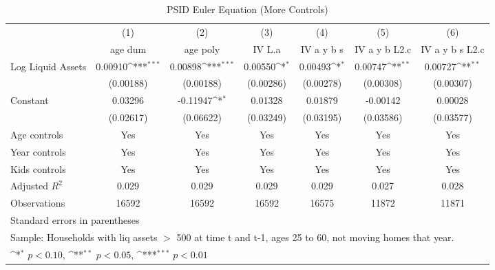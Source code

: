 {
\def\sym#1{\ifmmode^{#1}\else\(^{#1}\)\fi}
\begin{longtable}{l*{6}{c}}
\caption{PSID Euler Equation (More Controls)}\\
\toprule\endfirsthead\midrule\endhead\midrule\endfoot\endlastfoot
                    &\multicolumn{1}{c}{(1)}&\multicolumn{1}{c}{(2)}&\multicolumn{1}{c}{(3)}&\multicolumn{1}{c}{(4)}&\multicolumn{1}{c}{(5)}&\multicolumn{1}{c}{(6)}\\
                    &\multicolumn{1}{c}{age dum}&\multicolumn{1}{c}{age poly}&\multicolumn{1}{c}{IV L.a}&\multicolumn{1}{c}{IV a y b s}&\multicolumn{1}{c}{IV a y b L2.c}&\multicolumn{1}{c}{IV a y b s L2.c}\\
\midrule
Log Liquid Assets   &     0.00910\sym{***}&     0.00898\sym{***}&     0.00550\sym{*}  &     0.00493\sym{*}  &     0.00747\sym{**} &     0.00727\sym{**} \\
                    &   (0.00188)         &   (0.00188)         &   (0.00286)         &   (0.00278)         &   (0.00308)         &   (0.00307)         \\
\addlinespace
Constant            &     0.03296         &    -0.11947\sym{*}  &     0.01328         &     0.01879         &    -0.00142         &     0.00028         \\
                    &   (0.02617)         &   (0.06622)         &   (0.03249)         &   (0.03195)         &   (0.03586)         &   (0.03577)         \\
\addlinespace
Age controls        &         Yes         &         Yes         &         Yes         &         Yes         &         Yes         &         Yes         \\
\addlinespace
Year controls       &         Yes         &         Yes         &         Yes         &         Yes         &         Yes         &         Yes         \\
\addlinespace
Kids controls       &         Yes         &         Yes         &         Yes         &         Yes         &         Yes         &         Yes         \\
\midrule
Adjusted \(R^{2}\)  &       0.029         &       0.029         &       0.029         &       0.029         &       0.027         &       0.028         \\
Observations        &       16592         &       16592         &       16592         &       16575         &       11872         &       11871         \\
\bottomrule
\multicolumn{7}{l}{\footnotesize Standard errors in parentheses}\\
\multicolumn{7}{l}{\footnotesize Sample: Households with liq assets $>$ 500 at time t and t-1, ages 25 to 60, not moving homes that year.}\\
\multicolumn{7}{l}{\footnotesize \sym{*} \(p<0.10\), \sym{**} \(p<0.05\), \sym{***} \(p<0.01\)}\\
\end{longtable}
}
